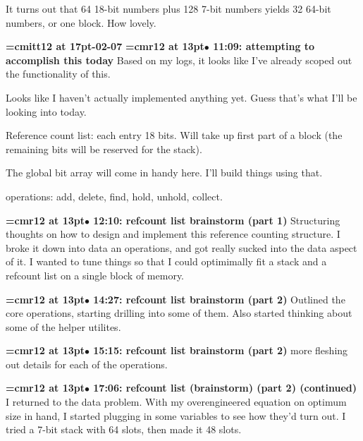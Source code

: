 It turns out that 64 18-bit numbers plus 128 7-bit numbers yields 32 64-bit numbers, or one block. How lovely.
\par

{\medskip\noindent\bf\font\titlefont=cmitt12 at 17pt-02-07}\medskip
{\smallskip\noindent\bf\font\titlefont=cmr12 at 13pt\titlefont $\bullet$ 11:09: attempting to accomplish this today}\smallskip
Based on my logs, it looks like I've already scoped out the functionality of this.
\par

Looks like I haven't actually implemented anything yet.  Guess that's what I'll be looking into today.
\par

Reference count list: each entry 18 bits. Will take up first part of a block (the remaining bits will be reserved for the stack).
\par

The global bit array will come in handy here. I'll build things using that.
\par

operations: add, delete, find, hold, unhold, collect.
\par

{\smallskip\noindent\bf\font\titlefont=cmr12 at 13pt\titlefont $\bullet$ 12:10: refcount list brainstorm (part 1)}\smallskip
Structuring thoughts on how to design and implement this reference counting structure. I broke it down into data an operations, and got really sucked into the data aspect of it. I wanted to tune things so that I could optimimally fit a stack and a refcount list on a single block of memory.
\par

{\smallskip\noindent\bf\font\titlefont=cmr12 at 13pt\titlefont $\bullet$ 14:27: refcount list brainstorm (part 2)}\smallskip
Outlined the core operations, starting drilling into some of them. Also started thinking about some of the helper utilites.
\par

{\smallskip\noindent\bf\font\titlefont=cmr12 at 13pt\titlefont $\bullet$ 15:15: refcount list brainstorm (part 2)}\smallskip
more fleshing out details for each of the operations.
\par

{\smallskip\noindent\bf\font\titlefont=cmr12 at 13pt\titlefont $\bullet$ 17:06: refcount list (brainstorm) (part 2) (continued)}\smallskip
I returned to the data problem. With my overengineered equation on optimum size in hand, I started plugging in some variables to see how they'd turn out. I tried a 7-bit stack with 64 slots, then made it 48 slots.
\par

